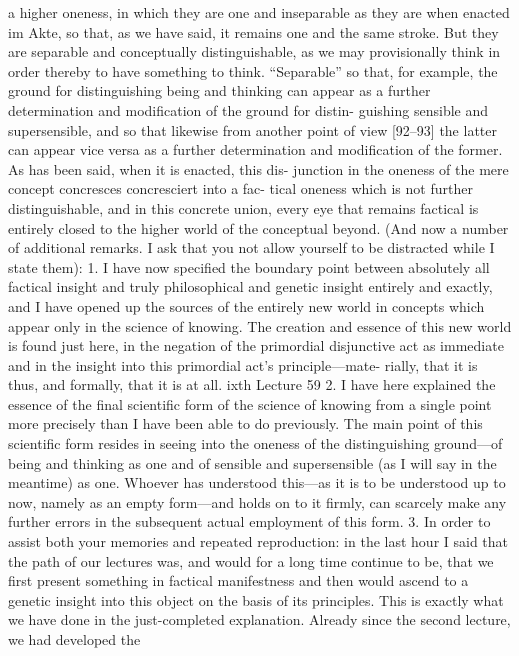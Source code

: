 a higher oneness, in which they are one and inseparable as they are when
enacted {im Akte}, so that, as we have said, it remains one and the same
stroke.
But they are separable and conceptually distinguishable, as we may
provisionally think in order thereby to have something to think.
“Separable”
so that, for example, the ground for distinguishing being and thinking can
appear as a further determination and modification of the ground for distin-
guishing sensible and supersensible, and so that likewise from another point
of view [92–93] the latter can appear vice versa as a further determination
and modification of the former.
As has been said, when it is enacted, this dis-
junction in the oneness of the mere concept concresces {concresciert} into a fac-
tical oneness which is not further distinguishable, and in this concrete union,
every eye that remains factical is entirely closed to the higher world of the
conceptual beyond.
(And now a number of additional remarks.
I ask that you not allow
yourself to be distracted while I state them):
1.
I have now specified the boundary point between absolutely all factical
insight and truly philosophical and genetic insight entirely and exactly, and
I have opened up the sources of the entirely new world in concepts which
appear only in the science of knowing.
The creation and essence of this new
world is found just here, in the negation of the primordial disjunctive act
as immediate and in the insight into this primordial act’s principle—mate-
rially, that it is thus, and formally, that it is at all.
ixth Lecture
59
2.
I have here explained the essence of the final scientific form of the science
of knowing from a single point more precisely than I have been able to do
previously.
The main point of this scientific form resides in seeing into the
oneness of the distinguishing ground—of being and thinking as one and of
sensible and supersensible (as I will say in the meantime) as one.
Whoever
has understood this—as it is to be understood up to now, namely as an
empty form—and holds on to it firmly, can scarcely make any further errors
in the subsequent actual employment of this form.
3.
In order to assist both your memories and repeated reproduction: in the
last hour I said that the path of our lectures was, and would for a long time
continue to be, that we first present something in factical manifestness
and then would ascend to a genetic insight into this object on the basis of
its principles.
This is exactly what we have done in the just-completed
explanation.
Already since the second lecture, we had developed the
